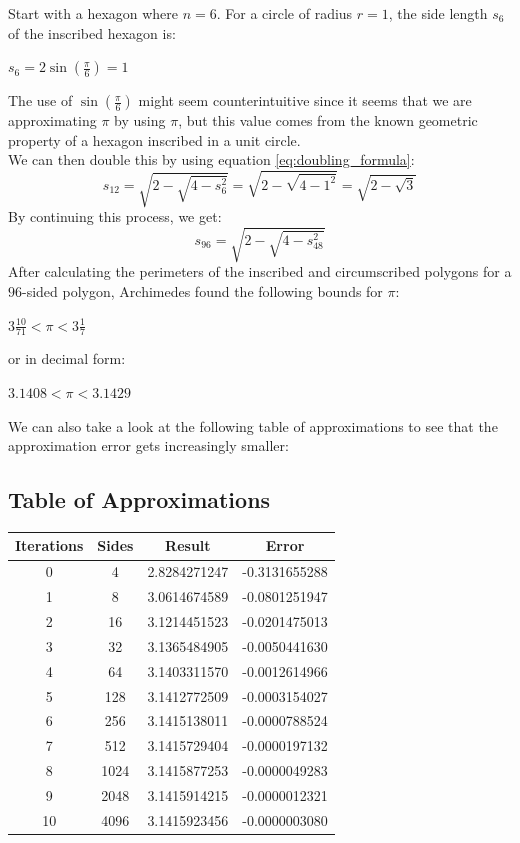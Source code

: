 \documentclass[12pt]{article}
\begin{document}
\noindent Start with a hexagon where $n = 6$. For a circle of radius $r = 1$, the side length $s_6$ of the inscribed hexagon is:
\begin{center}
    $s_6 = 2\sin(\frac{\pi}{6}) = 1$
\end{center}
The use of $\sin(\frac{\pi}{6})$ might seem counterintuitive since it seems that we are approximating $\pi$ by using $\pi$, but this value comes from the known geometric property of a hexagon inscribed in a unit circle.\\

\noindent We can then double this by using equation \ref{eq:doubling_formula}:
\begin{equation}
    s_{12} = \sqrt{2 - \sqrt{4 - s_6^2}} = \sqrt{2 - \sqrt{4 - 1^2}} = \sqrt{2 - \sqrt{3}}
\end{equation}
By continuing this process, we get:
\begin{equation}
    s_{96} = \sqrt{2 - \sqrt{4 - s_{48}^2}}
\end{equation}
After calculating the perimeters of the inscribed and circumscribed polygons for a $96$-sided polygon, Archimedes found the following bounds for $\pi$:
\begin{center}
    $3 \frac{10}{71} < \pi < 3\frac{1}{7}$
\end{center}
or in decimal form:
\begin{center}
    $3.1408 < \pi < 3.1429$
\end{center}
We can also take a look at the following table of approximations to see that the approximation error gets increasingly smaller:
\subsection*{Table of Approximations}

\begin{center}
    \begin{tabular}{cccc}
        \toprule
        \textbf{Iterations} & \textbf{Sides} & \textbf{Result} & \textbf{Error} \\
        \midrule
        0  & 4     & 2.8284271247 & -0.3131655288 \\
        1  & 8     & 3.0614674589 & -0.0801251947 \\
        2  & 16    & 3.1214451523 & -0.0201475013 \\
        3  & 32    & 3.1365484905 & -0.0050441630 \\
        4  & 64    & 3.1403311570 & -0.0012614966 \\
        5  & 128   & 3.1412772509 & -0.0003154027 \\
        6  & 256   & 3.1415138011 & -0.0000788524 \\
        7  & 512   & 3.1415729404 & -0.0000197132 \\
        8  & 1024  & 3.1415877253 & -0.0000049283 \\
        9  & 2048  & 3.1415914215 & -0.0000012321 \\
        10 & 4096  & 3.1415923456 & -0.0000003080 \\
        \bottomrule
    \end{tabular}
\end{center}
\end{document}
